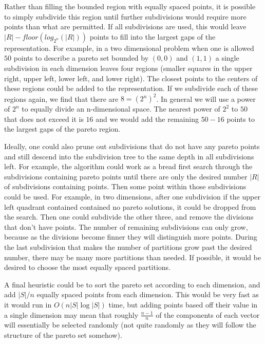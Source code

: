 \documentclass{article}
\begin{document}
Rather than filling the bounded region with equally spaced points, it is possible to simply subdivide this region until further subdivisions would require more points than what are permitted.
If all subdivisions are used, this would leave $|R| - floor(log_{2^n}(|R|))$ points to fill into the largest gaps of the representation.
For example, in a two dimensional problem when one is allowed $50$ points to describe a pareto set bounded by $(0,0)$ and $(1,1)$ a single subdivision in each dimension leaves four regions
(smaller squares in the upper right, upper left, lower left, and lower right).
The closest points to the centers of these regions could be added to the representation.
If we subdivide each of these regions again, we find that there are $8 = (2^n)^2$.
In general we will use a power of $2^n$ to equally divide an n-dimensional space.
The nearest power of $2^2$ to $50$ that does not exceed it is $16$ and we would add the remaining $50 - 16$ points to the largest gaps of the pareto region.

Ideally, one could also prune out subdivisions that do not have any pareto points and still descend into the subdivision tree to the same depth in all subdivisions left.
For example, the algorithm could work as a bread first search through the subdivisions containing pareto points until there are only the desired number $|R|$ of subdivisions containing points.
Then some point within those subdivisions could be used.
For example, in two dimensions, after one subdivision if the upper left quadrant contained contained no pareto solutions, it could be dropped from the search.
Then one could subdivide the other three, and remove the divisions that don't have points.
The number of remaining subdivisions can only grow, because as the divisions become finner they will distinguish more points.
During the last subdivision that makes the number of partitions grow past the desired number, there may be many more partitions than needed.
If possible, it would be desired to choose the most equally spaced partitions.

A final heuristic could be to sort the pareto set according to each dimension, and add $|S| / n$ equally spaced points from each dimension.
This would be very fast as it would run in $O(n  |S| \log |S|)$ time, but adding points based off their value in a single dimension may mean that roughly $\frac {n-1}n$ of the 
components of each vector will essentially be selected randomly (not quite randomly as they will follow the structure of the pareto set somehow).
\end{document}
